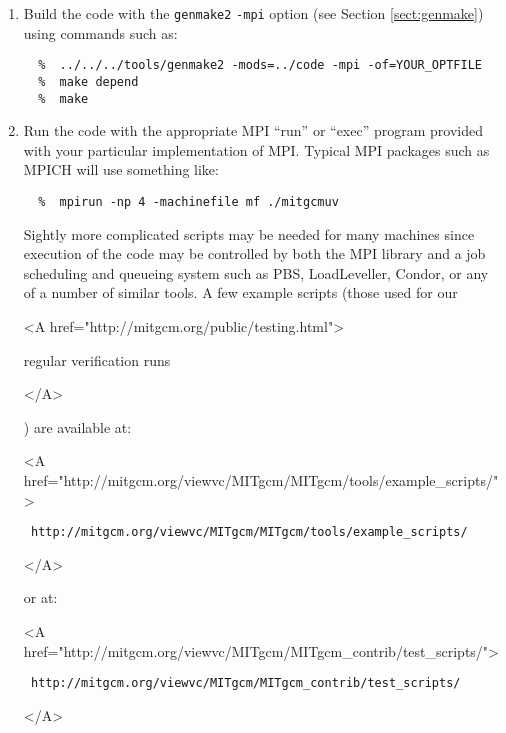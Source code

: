 \begin{enumerate}
\begin{itemize}
  \item \begin{rawhtml} <A
      href="http://www.osc.edu/~pw/mpiexec/">
    \end{rawhtml}
    MPIexec
    \begin{rawhtml} </A> \end{rawhtml}
  \end{itemize}
  
\item Build the code with the \texttt{genmake2} \texttt{-mpi} option
  (see Section \ref{sect:genmake}) using commands such as:
{\footnotesize \begin{verbatim}
  %  ../../../tools/genmake2 -mods=../code -mpi -of=YOUR_OPTFILE
  %  make depend
  %  make
\end{verbatim} }
  
\item Run the code with the appropriate MPI ``run'' or ``exec''
  program provided with your particular implementation of MPI.
  Typical MPI packages such as MPICH will use something like:
\begin{verbatim}
  %  mpirun -np 4 -machinefile mf ./mitgcmuv
\end{verbatim}
  Sightly more complicated scripts may be needed for many machines
  since execution of the code may be controlled by both the MPI
  library and a job scheduling and queueing system such as PBS,
  LoadLeveller, Condor, or any of a number of similar tools.  A few
  example scripts (those used for our \begin{rawhtml} <A
    href="http://mitgcm.org/public/testing.html"> \end{rawhtml}regular
  verification runs\begin{rawhtml} </A> \end{rawhtml}) are available
  at:
  \begin{rawhtml} <A
    href="http://mitgcm.org/viewvc/MITgcm/MITgcm/tools/example_scripts/">
  \end{rawhtml}
  {\footnotesize \tt
    http://mitgcm.org/viewvc/MITgcm/MITgcm/tools/example\_scripts/ }
  \begin{rawhtml} </A> \end{rawhtml}
  or at:
  \begin{rawhtml} <A
    href="http://mitgcm.org/viewvc/MITgcm/MITgcm_contrib/test_scripts/">
  \end{rawhtml}
  {\footnotesize \tt
    http://mitgcm.org/viewvc/MITgcm/MITgcm\_contrib/test\_scripts/ }
  \begin{rawhtml} </A> \end{rawhtml}

\end{enumerate}

